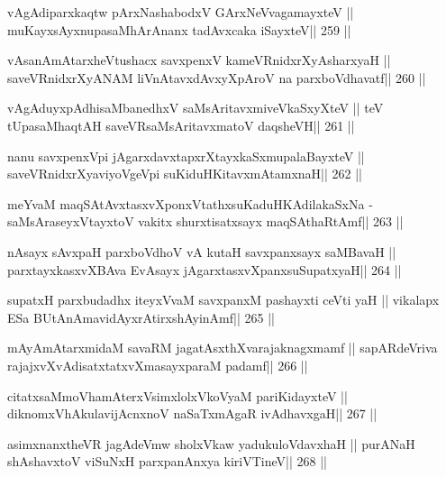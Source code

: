 \begin{shl}
vAgAdiparxkaqtw pArxNashabodxV GArxNeV\s vagamayxteV ||
muKayxsAyxnupasaMhArAnanx tadAvxcaka iSayxteV\hfill || 259 ||
\end{shl}

\begin{shl}
vAsanAmAtarxheVtushacx savxpenxV kameVRnidxrXyAsharxyaH ||
saveVRnidxrXyANAM liVnAtavxdAvxyXpAroV na parxboVdhavatf\hfill || 260 ||
\end{shl}

\begin{shl}
vAgAduyxpAdhisaMbanedhxV saMsAritavxmiveVkaSxyXteV ||
teV tUpasaMhaqtAH saveVR\s saMsAritavxmatoV daqsheVH\hfill || 261 ||
\end{shl}

\begin{shl}
nanu savxpenxV\s pi jAgarxdavxtapxrXtayxkaSxmupalaBayxteV ||
saveVRnidxrXyaviyoVgeV\s pi suKiduHKitavxmAtamxnaH\hfill || 262 ||
\end{shl}

\begin{shl}
meYvaM maqSAtAvxtasxvXponxVtathxsuKaduHKAdilakaSxNa -
saMsAraseyxVtayxtoV vakitx shurxtisatxsayx maqSAthaRtAmf\hfill || 263 ||
\end{shl}

\begin{shl}
nAsayx sAvxpaH parxboVdhoV vA kutaH savxpanxsayx saMBavaH ||
parxtayxkasxvXBAva EvAsayx jAgarxtasxvXpanxsuSupatxyaH\hfill || 264 ||
\end{shl}

\begin{shl}
supatxH parxbudadhx iteyxVvaM savxpanxM pashayxti ceVti yaH ||
vikalapx ESa BUtAnAmavidAyxrAtirxshAyinAmf\hfill || 265 ||
\end{shl}

\begin{shl}
mAyAmAtarxmidaM savaRM jagatAsxthXvarajaknagxmamf ||
sapARdeVriva rajajxvXvAdisatxtatxvXmasayxparaM padamf\hfill || 266 ||
\end{shl}

\begin{shl}
citatxsaMmoVhamAterxVsimxlolxVkoV\s yaM pariKidayxteV ||
diknomxVhAkulavijAcnxnoV naSaTxmAgaR ivAdhavxgaH\hfill || 267 ||
\end{shl}

\begin{shl}
asimxnanxtheVR jagAdeVmw sholxVkaw yadukuloVdavxhaH ||
purANaH shAshavxtoV viSuNxH parxpanAnxya kiriVTineV\hfill || 268 ||
\end{shl}

